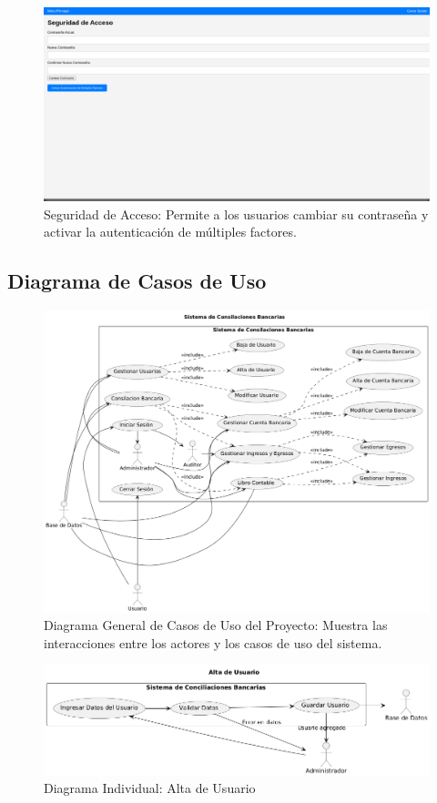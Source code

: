 \documentclass{article}
\begin{document}
\begin{figure}[H]
    \centering
    \includegraphics[width=\textwidth]{img/image9.png}
    \caption{Seguridad de Acceso: Permite a los usuarios cambiar su contraseña y activar la autenticación de múltiples factores.}
\end{figure}

\newpage
\subsection{Diagrama de Casos de Uso}

\begin{figure}[H]
    \centering
    \includegraphics[width=\textwidth]{casos/UML-General.png}
    \caption{Diagrama General de Casos de Uso del Proyecto: Muestra las interacciones entre los actores y los casos de uso del sistema.}
\end{figure}

\begin{figure}[H]
    \centering
    \includegraphics[width=\textwidth]{casos/AltaUsuario.png}
    \caption{Diagrama Individual: Alta de Usuario}
\end{figure}
\end{document}
